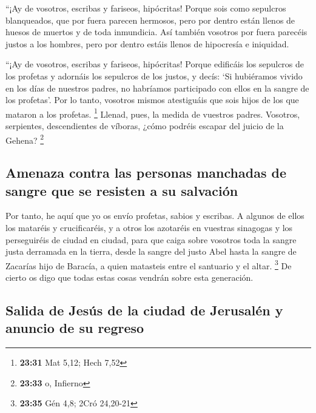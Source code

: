 \begin{paracol}{2}
 ``¡Ay de vosotros, escribas y fariseos, hipócritas!
Porque sois como sepulcros blanqueados, que por fuera parecen hermosos,
pero por dentro están llenos de huesos de muertos y de toda inmundicia.
 Así también vosotros por fuera parecéis justos a los
hombres, pero por dentro estáis llenos de hipocresía e iniquidad.

 ``¡Ay de vosotros, escribas y fariseos, hipócritas!
Porque edificáis los sepulcros de los profetas y adornáis los sepulcros
de los justos,  y decís: `Si hubiéramos vivido en los
días de nuestros padres, no habríamos participado con ellos en la sangre
de los profetas'.  Por lo tanto, vosotros mismos
atestiguáis que sois hijos de los que mataron a los profetas.
\footnote{\textbf{23:31} Mat 5,12; Hech 7,52}  Llenad,
pues, la medida de vuestros padres.  Vosotros,
serpientes, descendientes de víboras, ¿cómo podréis escapar del juicio
de la Gehena? \footnote{\textbf{23:33} o, Infierno}

\hypertarget{amenaza-contra-las-personas-manchadas-de-sangre-que-se-resisten-a-su-salvaciuxf3n}{%
\subsection{Amenaza contra las personas manchadas de sangre que se
resisten a su
salvación}\label{amenaza-contra-las-personas-manchadas-de-sangre-que-se-resisten-a-su-salvaciuxf3n}}

 Por tanto, he aquí que yo os envío profetas, sabios y
escribas. A algunos de ellos los mataréis y crucificaréis, y a otros los
azotaréis en vuestras sinagogas y los perseguiréis de ciudad en ciudad,
 para que caiga sobre vosotros toda la sangre justa
derramada en la tierra, desde la sangre del justo Abel hasta la sangre
de Zacarías hijo de Baracía, a quien matasteis entre el santuario y el
altar. \footnote{\textbf{23:35} Gén 4,8; 2Cró 24,20-21} 
De cierto os digo que todas estas cosas vendrán sobre esta generación.

\hypertarget{salida-de-jesuxfas-de-la-ciudad-de-jerusaluxe9n-y-anuncio-de-su-regreso}{%
\subsection{Salida de Jesús de la ciudad de Jerusalén y anuncio de su
regreso}\label{salida-de-jesuxfas-de-la-ciudad-de-jerusaluxe9n-y-anuncio-de-su-regreso}}


\end{paracol}
